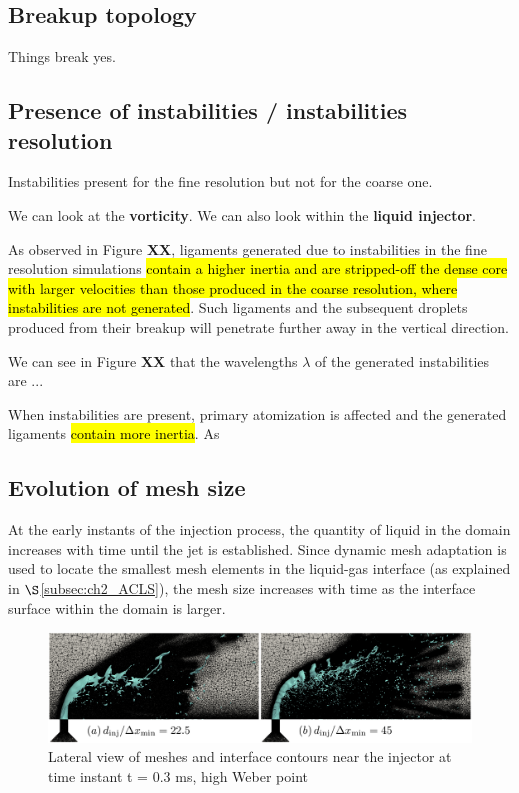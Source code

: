 \clearpage

\subsection{Breakup topology}

Things break yes.

\subsection{Presence of instabilities / instabilities resolution}
\label{subsec:ch5_instabilities_presence}

Instabilities present for the fine resolution but not for the coarse one.

We can look at the \textbf{vorticity}. We can also look within the \textbf{liquid injector}.

As observed in Figure \textbf{XX}, ligaments generated due to instabilities in the fine resolution simulations \hl{contain a higher inertia and are stripped-off the dense core with larger velocities than those produced in the coarse resolution, where instabilities are not generated}. Such ligaments and the subsequent droplets produced from their breakup will penetrate further away in the vertical direction.

We can see in Figure \textbf{XX} that the wavelengths $\lambda$ of the generated instabilities are ...

When instabilities are present, primary atomization is affected and the generated ligaments \hl{contain more inertia}. As


\subsection{Evolution of mesh size}

At the early instants of the injection process, the quantity of liquid in the domain increases with time until the jet is established. Since dynamic mesh adaptation is used to locate the smallest mesh elements in the liquid-gas interface (as explained in $\S$\ref{subsec:ch2_ACLS}), the mesh size increases with time as the interface surface within the domain is larger. 

\begin{figure}[ht]
\centering
	\centering
   \includegraphics[scale=0.25]{./part2_developments/figures_ch5_resolved_JICF/JICF_nelem_evolution/JICF_w_mesh}
\caption{Lateral view of meshes and interface contours near the injector at time instant t = 0.3 ms, high Weber point}
\label{fig:JICF_w_mesh}
\end{figure}

